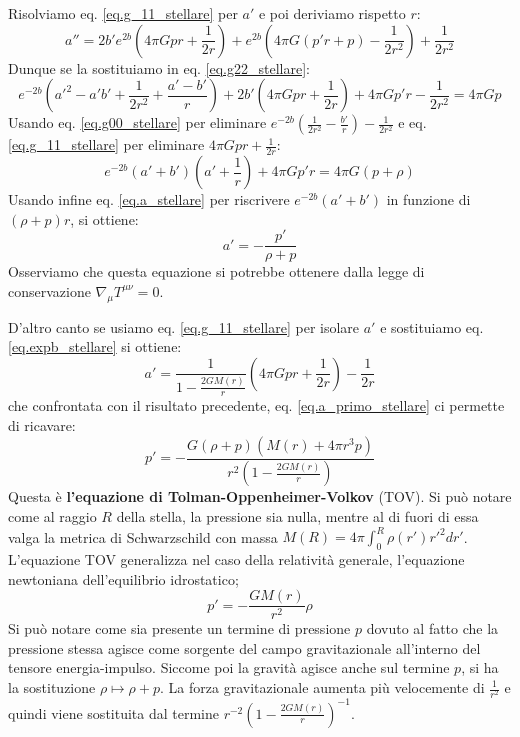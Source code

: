 Risolviamo eq. \ref{eq.g_11_stellare} per $a'$ e poi deriviamo rispetto $r$:
\begin{equation*}
    a'' =2b'e^{2b}(4\pi Gpr + \frac{1}{2r}) + e^{2b}\left(4\pi G(p'r + p) - \frac{1}{2r^2}\right) + \frac{1}{2r^2} 
\end{equation*}
Dunque se la sostituiamo in eq. \ref{eq.g22_stellare}:
\begin{equation*}
    e^{-2b}\left(a'^2 -a'b' + \frac{1}{2r^2} + \frac{a' - b'}{r}\right) + 2b'\left(4\pi Gpr + \frac{1}{2r}\right) + 4\pi G p' r - \frac{1}{2r^2} = 4\pi Gp
\end{equation*}
Usando eq. \ref{eq.g00_stellare} per eliminare $e^{-2b}(\frac{1}{2r^2} - \frac{b'}{r}) - \frac{1}{2r^2}$ e eq. \ref{eq.g_11_stellare} per eliminare $4\pi G pr + \frac{1}{2r}$:
\begin{equation*}
    e^{-2b}(a' + b')(a' + \frac{1}{r}) +4\pi Gp'r= 4\pi G(p + \rho)
\end{equation*}
Usando infine eq. \ref{eq.a_stellare} per riscrivere $e^{-2b}(a'+b')$ in funzione di $(\rho + p)r$, si ottiene:
\begin{equation}
    a' = - \frac{p'}{\rho + p}
    \label{eq.a_primo_stellare}
\end{equation}
Osserviamo che questa equazione si potrebbe ottenere dalla legge di conservazione $\nabla_\mu T^{\mu\nu} = 0$.

D'altro canto se usiamo eq. \ref{eq.g_11_stellare} per isolare $a'$ e sostituiamo eq. \ref{eq.expb_stellare} si ottiene:
\begin{equation*}
    a' = \frac{1}{1- \frac{2GM(r)}{r}}\left( 4\pi Gpr + \frac{1}{2r}\right) - \frac{1}{2r}
\end{equation*}
che confrontata con il risultato precedente, eq. \ref{eq.a_primo_stellare} ci permette di ricavare:
\begin{equation}
    p' = - \frac{G(\rho + p)(M(r) + 4\pi r^3 p)}{r^2\left(1 - \frac{2GM(r)}{r}\right)}
    \label{eq.tov}
\end{equation}
Questa è \textbf{l'equazione di Tolman-Oppenheimer-Volkov} (TOV). Si può notare come al raggio $R$ della stella, la pressione sia nulla, mentre al di fuori di essa valga la metrica di Schwarzschild con massa $M(R) = 4\pi \int_0^R \rho(r')r'^2dr'$. L'equazione TOV generalizza nel caso della relatività generale, l'equazione newtoniana dell'equilibrio idrostatico;
\begin{equation*}
    p' = - \frac{GM(r)}{r^2}\rho
\end{equation*}
Si può notare come sia presente un termine di pressione $p$ dovuto al fatto che la pressione stessa agisce come sorgente del campo gravitazionale all'interno del tensore energia-impulso. Siccome poi la gravità agisce anche sul termine $p$, si ha la sostituzione $\rho \mapsto \rho + p$. La forza gravitazionale aumenta più velocemente di $\frac{1}{r^2}$ e quindi viene sostituita dal termine $r^{-2}(1- \frac{2GM(r)}{r})^{-1}$.

